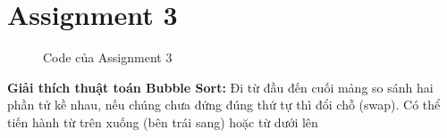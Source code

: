 \documentclass[a4paper,12pt]{article}
\begin{document}
\section{Assignment 3}
\begin{figure}[!h]
	\centering
	\caption{Code của Assignment 3} 
\end{figure}
\noindent
\textbf{Giải thích thuật toán Bubble Sort: } Đi từ đầu đến cuối mảng so sánh hai phần tử kề nhau, nếu chúng chưa đứng đúng thứ tự thì đổi chỗ (swap). Có thể tiến hành từ trên xuống (bên trái sang) hoặc từ dưới lên
\clearpage
\end{document}
